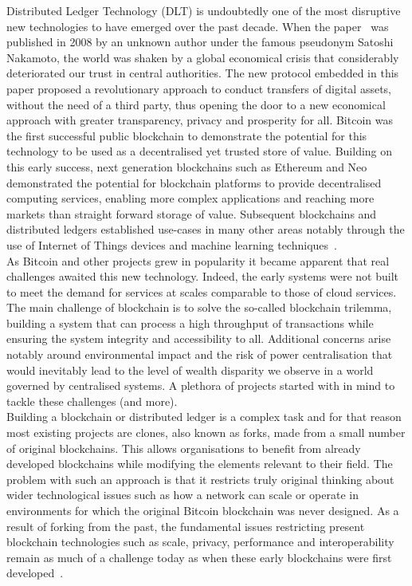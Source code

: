 Distributed Ledger Technology (DLT) is undoubtedly one of the most disruptive new technologies to have emerged over the past decade. When the paper~\cite{nakamoto} was published in 2008 by an unknown author under the famous pseudonym Satoshi Nakamoto, the world was shaken by a global economical crisis that considerably deteriorated our trust in central authorities. The new protocol embedded in this paper proposed a revolutionary approach to conduct transfers of digital assets, without the need of a third party, thus opening the door to a new economical approach with greater transparency, privacy and prosperity for all. Bitcoin was the first successful public blockchain to demonstrate the potential for this technology to be used as a decentralised yet trusted store of value. Building on this early success, next generation blockchains such as Ethereum and Neo demonstrated the potential for blockchain platforms to provide decentralised computing services, enabling more complex applications and reaching more markets than straight forward storage of value. Subsequent blockchains and distributed ledgers established use-cases in many other areas notably through the use of Internet of Things devices and machine learning techniques~\cite{govuk}.\\

As Bitcoin and other projects grew in popularity it became apparent that real challenges awaited this new technology. Indeed, the early systems were not built to meet the demand for services at scales comparable to those of cloud services. The main challenge of blockchain is to solve the so-called blockchain trilemma, building a system that can process a high throughput of transactions while ensuring the system integrity and accessibility to all. Additional concerns arise notably around environmental impact and the risk of power centralisation that would inevitably lead to the level of wealth disparity we observe in a world governed by centralised systems. A plethora of projects started with in mind to tackle these challenges (and more).\\

Building a blockchain or distributed ledger is a complex task and for that reason most existing projects are clones, also known as forks, made from a small number of original blockchains. This allows organisations to benefit from already developed blockchains while modifying the elements relevant to their field. The problem with such an approach is that it restricts truly original thinking about wider technological issues such as how a network can scale or operate in environments for which the original Bitcoin blockchain was never designed. As a result of forking from the past, the fundamental issues restricting present blockchain technologies such as scale, privacy, performance and interoperability remain as much of a challenge today as when these early blockchains were first developed~\cite{obst}.\\

